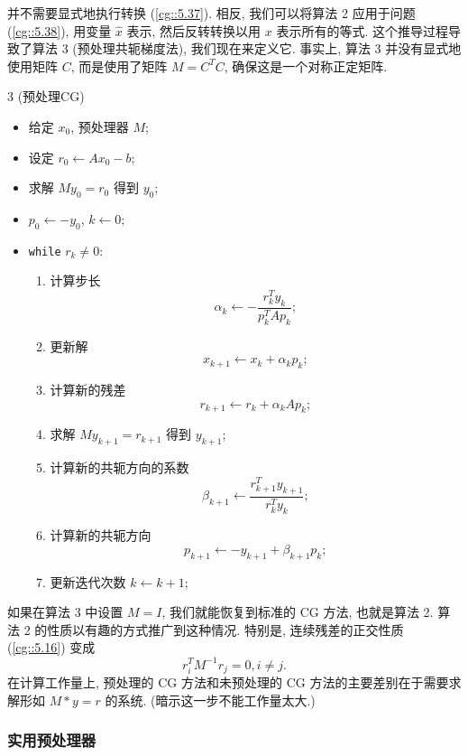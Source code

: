 \documentclass[a4paper]{ctexart}
\newcommand{\hl}[1]
{\noindent {\bf {#1}}}
\begin{document}
{并不需要显式地执行转换 (\ref{cg::5.37}). 相反, 我们可以将算法 2 
应用于问题 (\ref{cg::5.38}), 用变量 $\hat{x}$ 表示, 
然后反转转换以用 $x$ 表示所有的等式. 这个推导过程导致了算法 3 (预处理共轭梯度法), 我们现在来定义它. 
事实上, 算法 3 并没有显式地使用矩阵 $C$, 而是使用了矩阵 $M = C^{T}C$, 确保这是一个对称正定矩阵.

\hl{算法} 3 (预处理CG)

\begin{itemize}
  \item 给定 $x_0$, 预处理器 $M$;
  \item 设定 $r_0 \leftarrow Ax_0 - b$; 
  \item 求解 $My_0 = r_0$ 得到 $y_0$;
  \item $p_0 \leftarrow -y_0$, $k \leftarrow 0$;
  \item \verb|while| $r_k \neq 0$:
  \begin{enumerate}
  \item 计算步长 
  $$
  \alpha_k \leftarrow - \frac{r_k^T y_k}{p_k^T A p_k};
  $$
  \item 更新解
  $$ 
  x_{k + 1} \leftarrow x_k + \alpha_k p_k; 
  $$
  \item 计算新的残差
  $$
  r_{k + 1} \leftarrow r_{k} + \alpha_k A p_{k};
  $$
  \item 求解 
  $My_{k + 1} = r_{k + 1}$ 得到 $y_{k + 1}$;
  \item 计算新的共轭方向的系数
  $$
  \beta_{k + 1} \leftarrow \frac{r_{k + 1}^T y_{k + 1}}{r_k^T y_k};
  $$
  \item 计算新的共轭方向
  $$
  p_{k+1} \leftarrow -y_{k + 1} + \beta_{k + 1} p_k;
  $$
  \item 更新迭代次数 $k \leftarrow k + 1$;
  \end{enumerate}
\end{itemize}

如果在算法 3 中设置 $M = I$, 我们就能恢复到标准的 CG 方法, 
也就是算法 2. 算法 2 的性质以有趣的方式推广到这种情况. 特别是, 连续残差的正交性质 (\ref{cg::5.16})
变成
\begin{equation}
  r_i^TM^{-1}r_j = 0, i \neq j.
  \label{cg::5.40}
\end{equation}
在计算工作量上, 预处理的 CG 方法和未预处理的 CG 方法的主要差别在于需要求解形如 $M*y = r$ 的系统.
(暗示这一步不能工作量太大.)

\subsubsection*{实用预处理器}

}
\end{document}

